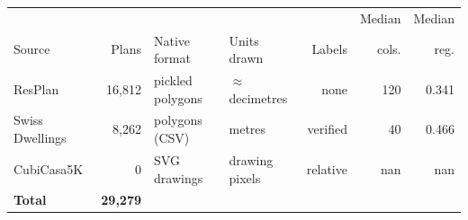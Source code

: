 \setlength{\tabcolsep}{4pt}
\begin{tabular}{@{}lrllrrr@{}}
\toprule
 & & & & & Median & Median \\
Source & Plans & Native format & Units drawn & Labels & cols. & reg. \\
\midrule
ResPlan & 16,812 & pickled polygons & $\approx$ decimetres & none & 120 & 0.341 \\
Swiss Dwellings & 8,262 & polygons (CSV) & metres & verified & 40 & 0.466 \\
CubiCasa5K & 0 & SVG drawings & drawing pixels & relative & nan & nan \\
\midrule
\textbf{Total} & \textbf{29,279} & & & & & \\
\bottomrule
\end{tabular}